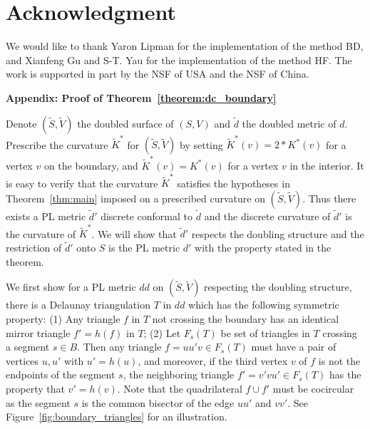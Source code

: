 \documentclass[11pt]{article}
\newenvironment{proof}[1][Proof]{\begin{trivlist}
\item[\hskip \labelsep {\bfseries #1}]}{\end{trivlist}}
\begin{document}
\section{Acknowledgment} 
We would like to thank Yaron Lipman for the implementation of the method BD, 
and Xianfeng Gu and S-T. Yau for the implementation of the method HF. 
The work is supported in part by the NSF of USA and the NSF of China.




\vspace{8mm}
\noindent\textbf{Appendix: Proof of Theorem~\ref{theorem:dc_boundary}}

\begin{proof}
Denote $(\tilde{S}, \tilde{V})$ the doubled surface of $(S, V)$ and $\tilde{d}$ the doubled metric
of $d$. Prescribe the curvature $\tilde{K}^*$ for $(\tilde{S}, \tilde{V})$ by setting 
$\tilde{K}^*(v) = 2 * K^*(v)$ for a vertex $v$ on the boundary, and $\tilde{K}^*(v) =  K^*(v)$ for a vertex $v$ in the interior.  
It is easy to verify that the curvature $\tilde{K}^*$ satisfies the hypotheses in Theorem~\ref{thm:main} imposed 
on a prescribed curvature on $ (\tilde{S}, \tilde{V})$. Thus there exists a PL metric $\tilde{d}'$ discrete
conformal to $\tilde{d}$ and the discrete curvature of $\tilde{d}'$ is the curvature of $\tilde{K}^*$.
We will show that $\tilde{d}'$ respects the doubling structure and the restriction of $\tilde{d}'$ onto
$S$ is the PL metric $d'$ with the property stated in the theorem. 

We first show for a PL metric $dd$ on $(\tilde{S}, \tilde{V})$ respecting the doubling structure, 
there is a Delaunay triangulation $T$ in $dd$ which has the following symmetric property: 
(1) Any triangle $f$ in $T$ not crossing the boundary has an identical mirror triangle $f'=h(f)$ in $T$; 
(2) Let $F_s(T)$ be set of triangles in $T$ crossing a segment $s\in B$. Then any triangle $f = uu'v \in F_s(T)$ 
must have a pair of vertices $u, u'$ with $u' = h(u)$, and moreover, if the third vertex $v$ of $f$ is not
the endpoints of the segment $s$, the neighboring triangle $f' = v'vu' \in F_s(T)$ has the property that $v'=h(v)$. 
Note that the quadrilateral $f\cup f'$ must be cocircular as the segment $s$ is the common bisector 
of the edge $uu'$ and $vv'$. See Figure~\ref{fig:boundary_triangles} for an illustration. 


\end{proof}
\end{document}
